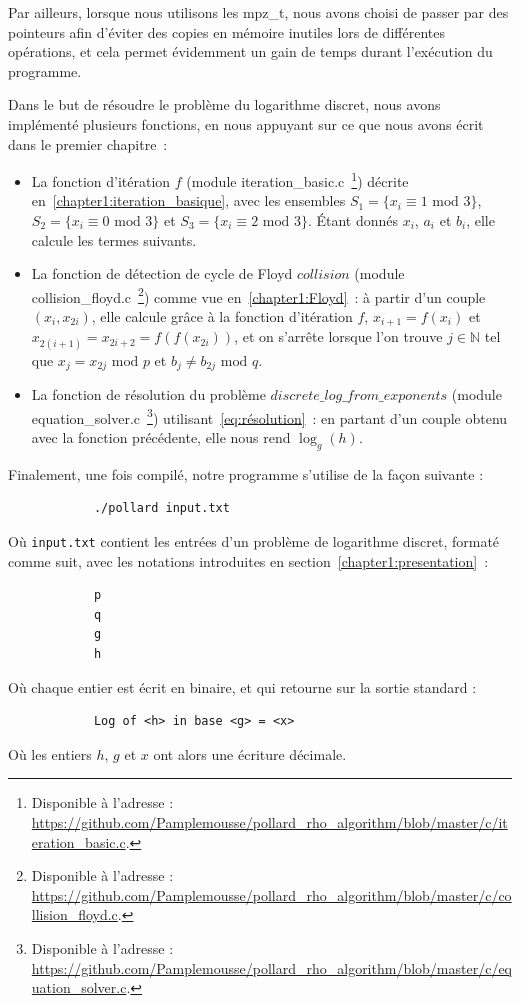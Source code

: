           Par ailleurs, lorsque nous utilisons les mpz\_t, nous avons choisi de passer par des pointeurs afin d'éviter des copies en mémoire inutiles lors de différentes opérations, et cela permet évidemment un gain de temps durant l'exécution du programme.

          Dans le but de résoudre le problème du logarithme discret, nous avons implémenté plusieurs fonctions, en nous appuyant sur ce que nous avons écrit dans le premier chapitre~:

          \begin{itemize}
            \item La fonction d'itération $f$ (module iteration\_basic.c~\footnote{Disponible à l'adresse : \url{https://github.com/Pamplemousse/pollard_rho_algorithm/blob/master/c/iteration_basic.c}.}) décrite en~\ref{chapter1:iteration_basique}, avec les ensembles $S_1 = \{ x_i \equiv 1 \text{ mod } 3 \}$, $S_2 = \{ x_i \equiv 0 \text{ mod } 3 \}$ et $S_3 = \{ x_i \equiv 2 \text{ mod } 3 \}$. Étant donnés $x_i$, $a_i$ et $b_i$, elle calcule les termes suivants.
            \item La fonction de détection de cycle de Floyd $collision$ (module collision\_floyd.c~\footnote{Disponible à l'adresse : \url{https://github.com/Pamplemousse/pollard_rho_algorithm/blob/master/c/collision_floyd.c}.}) comme vue en~\ref{chapter1:Floyd}~: à partir d'un couple $(x_i, x_{2i})$, elle calcule grâce à la fonction d'itération $f$, $x_{i+1} = f(x_i)$ et $x_{2(i+1)} = x_{2i+2} = f(f(x_{2i}))$, et on s'arrête lorsque l'on trouve $j \in \mathbb{N}$ tel que $x_j = x_{2j} \text{ mod } p$ et $b_j \neq b_{2j} \text{ mod } q$.
            \item La fonction de résolution du problème $discrete\_log\_from\_exponents$ (module equation\_solver.c~\footnote{Disponible à l'adresse : \url{https://github.com/Pamplemousse/pollard_rho_algorithm/blob/master/c/equation_solver.c}.}) utilisant~\eqref{eq:résolution}~: en partant d'un couple obtenu avec la fonction précédente, elle nous rend $\log_g(h)$.
          \end{itemize}


          Finalement, une fois compilé, notre programme s'utilise de la façon suivante :
          \begin{lstlisting}
            ./pollard input.txt
          \end{lstlisting}
          Où \lstinline{input.txt} contient les entrées d'un problème de logarithme discret, formaté comme suit, avec les notations introduites en section~\ref{chapter1:presentation}~:
          \begin{lstlisting}
            p
            q
            g
            h
          \end{lstlisting}
          Où chaque entier est écrit en binaire, et qui retourne sur la sortie standard :
          \begin{lstlisting}
            Log of <h> in base <g> = <x>
          \end{lstlisting}
          Où les entiers $h$, $g$ et $x$ ont alors une écriture décimale.




